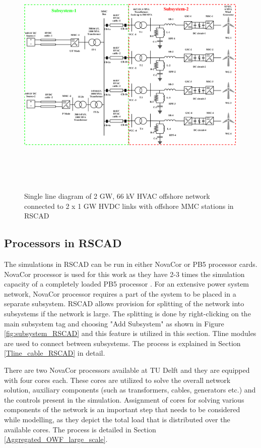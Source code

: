 \begin{figure}[H]
\centering
    \includegraphics[height = 12cm,width = 17cm]{Diagrams/Chapter_4/WT4_MMC2_new.pdf}
    \caption{Single line diagram of 2 GW, 66 kV HVAC offshore network connected to 2 x 1 GW HVDC links with offshore MMC stations in RSCAD}
    \label{fig:WT4_MMC2}
\end{figure}

\subsection{Processors in RSCAD}\label{split_system}
The simulations in RSCAD can be run in either NovaCor or PB5 processor cards. NovaCor processor is used for this work as they have 2-3 times the simulation capacity of a completely loaded PB5 processor \cite{noauthor_novacor_nodate}. For an extensive power system network, NovaCor processor requires a part of the system to be placed in a separate subsystem. RSCAD allows provision for splitting of the network into subsystems if the network is large. The splitting is done by right-clicking on the main subsystem tag and choosing "Add Subsystem" as shown in Figure \ref{fig:subsystem_RSCAD} and this feature is utilized in this section. Tline modules are used to connect between subsystems. The process is explained in Section \ref{Tline_cable_RSCAD} in detail.

There are two NovaCor processors available at TU Delft and they are equipped with four cores each. These cores are utilized to solve the overall network solution, auxiliary components (such as transformers, cables, generators etc.) and the controls present in the simulation. Assignment of cores for solving various components of the network is an important step that needs to be considered while modelling, as they depict the total load that is distributed over the available cores. The process is detailed in Section \ref{Aggregated_OWF_large_scale}. 


